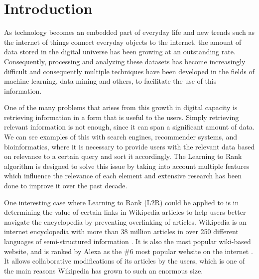 \section{Introduction}

As technology becomes an embedded part of everyday life and new trends such as the internet of things connect everyday objects to the internet, the amount of data stored in the digital universe has been growing at an outstanding rate. Consequently, processing and analyzing these datasets has become increasingly difficult and consequently multiple techniques have been developed in the fields of machine learning, data mining and others, to facilitate the use of this information.
%
%
%
%
%
%
%
%
%

One of the many problems that arises from this growth in digital capacity is retrieving information in a form that is useful to the users. Simply retrieving relevant information is not enough, since it can span a significant amount of data. We can see examples of this with search engines, recommender systems, and bioinformatics, where it is necessary to provide users with the relevant data based on relevance to a certain query and sort it accordingly. The Learning to Rank algorithm is designed to solve this issue by taking into account multiple features which influence the relevance of each element and extensive research has been done to improve it over the past decade.

One interesting case where Learning to Rank (L2R) could be applied to is in determining the value of certain links in Wikipedia articles to help users better navigate the encyclopedia by preventing overlinking of articles. Wikipedia is an internet encyclopedia with more than 38 million articles in over 250 different languages of semi-structured information \cite{wikistats}. It is also the most popular wiki-based website, and is ranked by Alexa as the \#6 most popular website on the internet \cite{alexa}. It allows collaborative modifications of its articles by the users, which is one of the main reasons Wikipedia has grown to such an enormous size.
%
%
%
%
%
%

